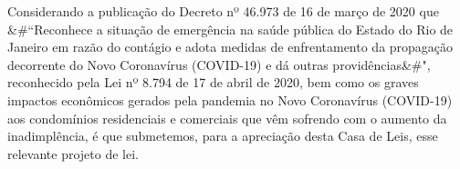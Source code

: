 \documentclass[10pt]{article}
\begin{document}
  Considerando a publicação do Decreto nº 46.973 de 16 de março de 2020 que &#``Reconhece a situação de emergência na saúde pública do Estado do Rio de Janeiro em razão do contágio e adota medidas de enfrentamento da propagação decorrente do Novo Coronavírus (COVID-19) e dá outras providências&#", reconhecido pela Lei nº 8.794 de 17 de abril de 2020, bem como os graves impactos econômicos gerados pela pandemia no Novo Coronavírus (COVID-19) aos condomínios residenciais e comerciais que vêm sofrendo com o aumento da inadimplência, é que submetemos, para a apreciação desta Casa de Leis, esse relevante projeto de lei. 



\iffalse
\begin{center}
  \textbf{REFERÊNCIAS}
\end{center}


\fi
\end{document}
